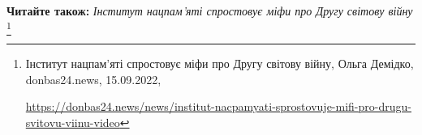 
 
 
 
 

\textbf{Читайте також:} \emph{Інститут нацпам'яті спростовує міфи про Другу світову війну}%
\footnote{Інститут нацпам'яті спростовує міфи про Другу світову війну, Ольга Демідко, donbas24.news, 15.09.2022, \par%
\url{https://donbas24.news/news/institut-nacpamyati-sprostovuje-mifi-pro-drugu-svitovu-viinu-video}%
}
